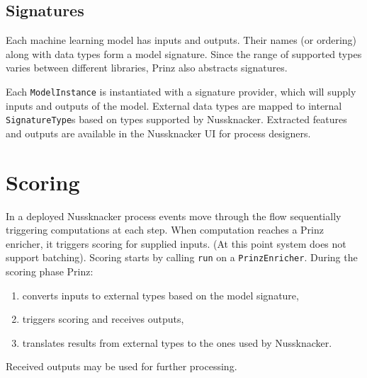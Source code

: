 \subsection{Signatures}

Each machine learning model has inputs and outputs.
Their names (or ordering) along with data types form a model signature.
Since the range of supported types varies between different libraries, Prinz also abstracts signatures.

Each \texttt{ModelInstance} is instantiated with a signature provider, which will supply inputs and outputs of the model.
External data types are mapped to internal \texttt{SignatureType}s based on types supported by Nussknacker.
Extracted features and outputs are available in the Nussknacker UI for process designers.

\section{Scoring}

In a deployed Nussknacker process events move through the flow sequentially triggering computations at each step.
When computation reaches a Prinz enricher, it triggers scoring for supplied inputs.
(At this point system does not support batching).
Scoring starts by calling \texttt{run} on a \texttt{PrinzEnricher}.
During the scoring phase Prinz:
\begin{enumerate}
    \item converts inputs to external types based on the model signature,
    \item triggers scoring and receives outputs,
    \item translates results from external types to the ones used by Nussknacker.
\end{enumerate}
Received outputs may be used for further processing.
